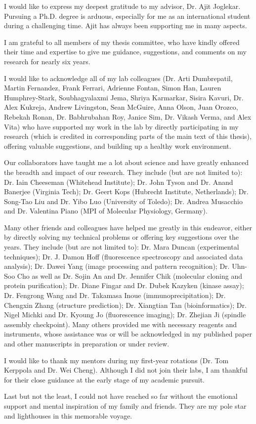 I would like to express my deepest gratitude to my advisor, Dr. Ajit Joglekar. Pursuing a Ph.D. degree is arduous, especially for me as an international student during a challenging time. Ajit has always been supporting me in many aspects.

I am grateful to all members of my thesis committee, who have kindly offered their time and expertise to give me guidance, suggestions, and comments on my research for nearly six years.

I would like to acknowledge all of my lab colleagues (Dr. Arti Dumbrepatil, Martin Fernandez, Frank Ferrari, Adrienne Fontan, Simon Han, Lauren Humphrey-Stark, Soubhagyalaxmi Jema, Shriya Karmarkar, Sisira Kavuri, Dr. Alex Kukreja, Andrew Livingston, Sean McGuire, Anna Olson, Juan Orozco, Rebekah Ronan, Dr. Babhrubahan Roy, Janice Sim, Dr. Vikash Verma, and Alex Vita) who have supported my work in the lab by directly participating in my research (which is credited in corresponding parts of the main text of this thesis), offering valuable suggestions, and building up a healthy work environment.

Our collaborators have taught me a lot about science and have greatly enhanced the breadth and impact of our research. They include (but are not limited to): Dr. Iain Cheeseman (Whitehead Institute); Dr. John Tyson and Dr. Anand Banerjee (Virginia Tech); Dr. Geert Kops (Hubrecht Institute, Netherlands); Dr. Song-Tao Liu and Dr. Yibo Luo (University of Toledo); Dr. Andrea Musacchio and Dr. Valentina Piano (MPI of Molecular Physiology, Germany).

Many other friends and colleagues have helped me greatly in this endeavor, either by directly solving my technical problems or offering key suggestions over the years. They include (but are not limited to): Dr. Mara Duncan (experimental techniques); Dr. J. Damon Hoff (fluorescence spectroscopy and associated data analysis); Dr. Dawei Yang (image processing and pattern recognition); Dr. Uhn-Soo Cho as well as Dr. Sojin An and Dr. Jennifer Chik (molecular cloning and protein purification); Dr. Diane Fingar and Dr. Dubek Kazyken (kinase assay); Dr. Fengrong Wang and Dr. Takamasa Inoue (immunoprecipitation); Dr. Chengxin Zhang (structure prediction); Dr. Xiangtian Tan (bioinformatics); Dr. Nigel Michki and Dr. Kyoung Jo (fluorescence imaging); Dr. Zhejian Ji (spindle assembly checkpoint). Many others provided me with necessary reagents and instruments, whose assistance was or will be acknowledged in my published paper \cite{eSAC} and other manuscripts in preparation or under review.

I would like to thank my mentors during my first-year rotations (Dr. Tom Kerppola and Dr. Wei Cheng). Although I did not join their labs, I am thankful for their close guidance at the early stage of my academic pursuit.%

Last but not the least, I could not have reached so far without the emotional support and mental inspiration of my family and friends. They are my pole star and lighthouses in this memorable voyage.